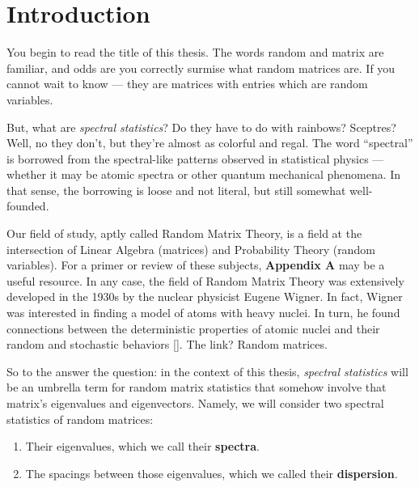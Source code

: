
  \chapter*{Introduction}


You begin to read the title of this thesis. The words random and matrix are familiar, and odds are you correctly surmise what random matrices are.
If you cannot wait to know --- they are matrices with entries which are random variables.

But, what are \textit{spectral statistics}? Do they have to do with rainbows? Sceptres? Well, no they don’t, but they’re almost as colorful and regal.
The word ``spectral'' is borrowed from the spectral-like patterns observed in statistical physics --- whether it may be atomic spectra or other quantum mechanical phenomena.
In that sense, the borrowing is loose and not literal, but still somewhat well-founded.

Our field of study, aptly called Random Matrix Theory, is a field at the intersection of Linear Algebra (matrices) and Probability Theory (random variables).
For a primer or review of these subjects, \textbf{Appendix A} may be a useful resource.
In any case, the field of Random Matrix Theory was extensively developed in the 1930s by the nuclear physicist Eugene Wigner. In fact, Wigner was interested in finding a model of atoms with heavy nuclei.
In turn, he found connections between the deterministic properties of atomic nuclei and their random and stochastic behaviors [\cite{wigneratom}].
The link? Random matrices.

So to the answer the question: in the context of this thesis, \textit{spectral statistics} will be an umbrella term for random matrix statistics that somehow involve that matrix's eigenvalues and eigenvectors.
Namely, we will consider two spectral statistics of random matrices:
  \begin{enumerate}
    \item Their eigenvalues, which we call their \textbf{spectra}.
    \item The spacings between those eigenvalues, which we called their \textbf{dispersion}.
  \end{enumerate}

